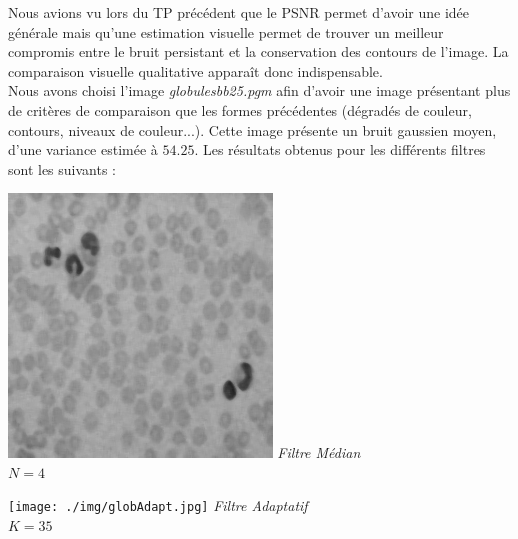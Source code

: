 \documentclass[a4,12pt]{article}
\begin{document}
Nous avions vu lors du TP précédent que le PSNR permet d'avoir une idée générale mais qu'une estimation visuelle permet de trouver un meilleur compromis entre le bruit persistant et la conservation des contours de l'image. La comparaison visuelle qualitative apparaît donc indispensable.\\

Nous avons choisi l'image \textit{globulesbb25.pgm} afin d'avoir une image présentant plus de critères de comparaison que les formes précédentes (dégradés de couleur, contours, niveaux de couleur...). Cette image présente un bruit gaussien moyen, d'une variance estimée à $54.25$. Les résultats obtenus pour les différents filtres sont les suivants :\\

\noindent
\begin{center}
	\begin{minipage}[c]{0.45\linewidth}
		\begin{center}
			\includegraphics[width = 70mm]{./img/globb25Med4.jpg}
			\textit{Filtre Médian}\\
			\textit{$N=4$}\\
                        \hspace{2em}
		\end{center}
	\end{minipage}
	\begin{minipage}[c]{0.45\linewidth}
		\begin{center}
			\texttt{[image: ./img/globAdapt.jpg]}
			\textit{Filtre Adaptatif}\\
			\textit{$K = 35$}\\
                        \hspace{2em}
		\end{center}
	\end{minipage}
	\begin{minipage}[c]{0.45\linewidth}

\end{minipage}
\end{center}
\end{document}

